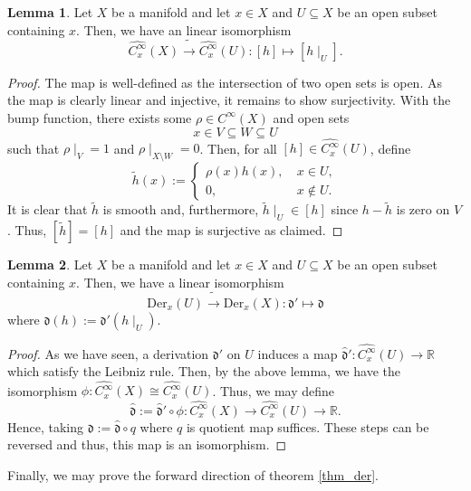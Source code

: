 \documentclass[]{article}
\theoremstyle{definition}
\theoremstyle{definition}
\newtheorem{lemma}{Lemma}[section]
\begin{document}
\begin{lemma}
  Let \(X\) be a manifold and let \(x \in X\) and \(U \subseteq X\) be an 
  open subset containing \(x\). Then, we have an linear isomorphism 
  \[\widehat{C_x^\infty}(X) \tilde \to \widehat{C_x^\infty}(U) : [h] \mapsto [h\mid_U].\]
\end{lemma}
\begin{proof}
  The map is well-defined as the intersection of two open sets is open. 
  As the map is clearly linear and injective, it remains to show surjectivity.
  With the bump function, there exists some \(\rho \in C^\infty(X)\) and open 
  sets 
  \[x \in V \subseteq W \subseteq U\] 
  such that \(\rho\mid_V = 1\) and \(\rho\mid_{X \setminus W} = 0\). Then, for 
  all \([h] \in \widehat{C_x^\infty}(U)\), define 
  \[\tilde h(x) := \begin{cases}
    \rho(x)h(x), \ &x \in U,\\
    0, \ &x \not \in U.
  \end{cases}\]
  It is clear that \(\tilde h\) is smooth and, furthermore, 
  \(\tilde h \mid_U \in [h]\) since \(h - \tilde h\) is zero on \(V\). Thus,
  \([\tilde h] = [h]\) and the map is surjective as claimed. 
\end{proof}

\begin{lemma}
  Let \(X\) be a manifold and let \(x \in X\) and \(U \subseteq X\) be an 
  open subset containing \(x\). Then, we have a linear isomorphism 
  \[\text{Der}_x(U) \tilde \to \text{Der}_x(X) : \mathfrak{d}' \mapsto 
    \mathfrak{d}\]
  where \(\mathfrak{d}(h) := \mathfrak{d}'(h\mid_U)\).
\end{lemma}
\begin{proof}
  As we have seen, a derivation \(\mathfrak{d}'\) on \(U\) induces a map 
  \(\hat{\mathfrak{d}}' : \widehat{C_x^\infty}(U) \to \mathbb{R}\) which 
  satisfy the Leibniz rule. Then, by the above lemma, we have the 
  isomorphism \(\phi : \widehat{C_x^\infty}(X) \cong \widehat{C_x^\infty}(U)\).
  Thus, we may define 
  \[\hat{\mathfrak{d}} := \hat{\mathfrak{d}}' \circ \phi : 
    \widehat{C_x^\infty}(X) \to \widehat{C_x^\infty}(U) \to \mathbb{R}.\] 
  Hence, taking \(\mathfrak{d} := \hat{\mathfrak{d}} \circ q\) where \(q\) 
  is quotient map suffices. These steps can be reversed and thus, this map 
  is an isomorphism.
\end{proof}

Finally, we may prove the forward direction of theorem \ref{thm_der}.
\end{document}
